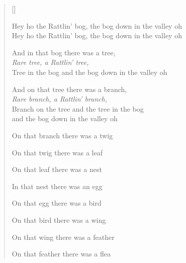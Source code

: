 \pagebreak
\settowidth{\versewidth}{Hey ho the Rattlin' bog the bog down in the valley oh}
\begin{verse}[\versewidth]
\\
\begin{chorus}
Hey ho the Rattlin' bog, the bog down in the valley oh\\
Hey ho the Rattlin' bog, the bog down in the valley oh
\end{chorus}

\begin{patverse}
And in that bog there was a tree,\\
\textit{Rare tree, a Rattlin' tree,}\\
Tree in the bog and the bog down in the valley oh
\end{patverse}

\begin{patverse}
And on that tree there was a branch,\\
\textit{Rare branch, a Rattlin' branch,}\\
Branch on the tree and the tree in the bog\\
and the bog down in the valley oh
\end{patverse}

On that branch there was a twig

On that twig there was a leaf

On that leaf there was a nest

In that nest there was an egg

On that egg there was a bird

On that bird there was a wing

On that wing there was a feather

On that feather there was a flea
\end{verse}
